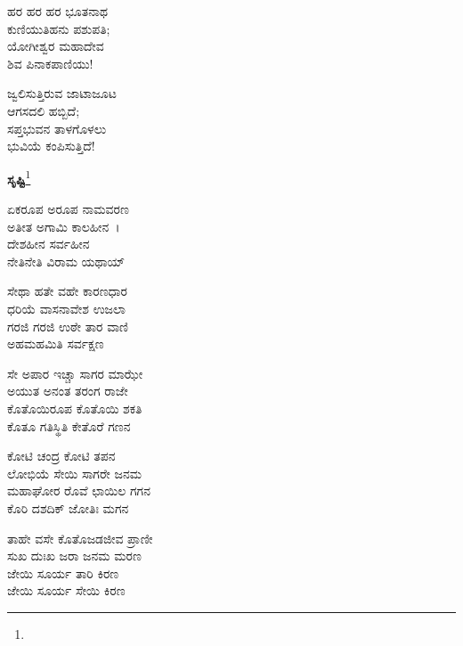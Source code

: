 \begin{myquote}
ಹರ ಹರ ಹರ ಭೂತನಾಥ\\ಕುಣಿಯುತಿಹನು ಪಶುಪತಿ;\\ಯೋಗೀಶ್ವರ ಮಹಾದೇವ\\ಶಿವ ಪಿನಾಕಪಾಣಿಯು!
\end{myquote}

\begin{myquote}
ಜ್ವಲಿಸುತ್ತಿರುವ ಜಾಟಾಜೂಟ\\ಆಗಸದಲಿ ಹಬ್ಬಿದೆ;\\ಸಪ್ತಭುವನ ತಾಳಗೊಳಲು\\ಭುವಿಯೆ ಕಂಪಿಸುತ್ತಿದೆ!
\end{myquote}

\begin{center}
\textbf{ಸೃಷ್ಟಿ}\footnote{}
\end{center}

\begin{myquote}
ಏಕರೂಪ ಅರೂಪ ನಾಮವರಣ\\ಅತೀತ ಅಗಾಮಿ ಕಾಲಹೀನ~।\\ದೇಶಹೀನ ಸರ್ವಹೀನ\\ನೇತಿನೇತಿ ವಿರಾಮ ಯಥಾಯ್
\end{myquote}


\begin{myquote}
ಸೇಥಾ ಹತೇ ವಹೇ ಕಾರಣಧಾರ\\ಧರಿಯೆ ವಾಸನಾವೇಶ ಉಜಲಾ\\ಗರಜಿ ಗರಜಿ ಉಠೇ ತಾರ ವಾಣಿ\\ಅಹಮಹಮಿತಿ ಸರ್ವಕ್ಷಣ
\end{myquote}


\begin{myquote}
ಸೇ ಅಪಾರ ಇಚ್ಚಾ ಸಾಗರ ಮಾಝೇ\\ಅಯುತ ಅನಂತ ತರಂಗ ರಾಜೇ\\ಕೊತೊಯಿರೂಪ ಕೊತೊಯಿ ಶಕತಿ\\ಕೊತೂ ಗತಿಸ್ಥಿತಿ ಕೇತೊರೆ ಗಣನ
\end{myquote}


\begin{myquote}
ಕೋಟಿ ಚಂದ್ರ ಕೋಟಿ ತಪನ\\ಲೋಭಿಯೆ ಸೇಯಿ ಸಾಗರೇ ಜನಮ\\ಮಹಾಘೋರ ರೊವೆ ಛಾಯಿಲ ಗಗನ\\ಕೊರಿ ದಶದಿಕ್ ಜೋತಿಃ ಮಗನ
\end{myquote}


\begin{myquote}
ತಾಹೇ ವಸೇ ಕೊತೊಜಡಜೀವ ಪ್ರಾಣೀ\\ಸುಖ ದುಃಖ ಜರಾ ಜನಮ ಮರಣ\\ಜೇಯಿ ಸೂರ್ಯ ತಾರಿ ಕಿರಣ\\ಜೇಯಿ ಸೂರ್ಯ ಸೇಯಿ ಕಿರಣ
\end{myquote}

